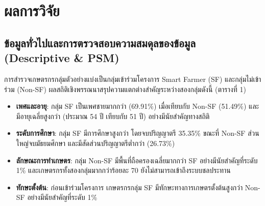 \chapter{ผลการวิจัย}

\section{ข้อมูลทั่วไปและการตรวจสอบความสมดุลของข้อมูล (Descriptive \& PSM)}

การสำรวจเกษตรกรกลุ่มตัวอย่างแบ่งเป็นกลุ่มเข้าร่วมโครงการ Smart Farmer (SF) และกลุ่มไม่เข้าร่วม (Non-SF) ผลสถิติเชิงพรรณนาสรุปความแตกต่างสำคัญระหว่างสองกลุ่มดังนี้ (ตารางที่ 1)

\begin{itemize}
\item \textbf{เพศและอายุ}: กลุ่ม SF เป็นเพศชายมากกว่า (69.91\%) เมื่อเทียบกับ Non-SF (51.49\%) และมีอายุเฉลี่ยสูงกว่า (ประมาณ 54 ปี เทียบกับ 51 ปี) อย่างมีนัยสำคัญทางสถิติ

\item \textbf{ระดับการศึกษา}: กลุ่ม SF มีการศึกษาสูงกว่า โดยจบปริญญาตรี 35.35\% ขณะที่ Non-SF ส่วนใหญ่จบมัธยมศึกษา และมีสัดส่วนปริญญาตรีต่ำกว่า (26.73\%)

\item \textbf{ลักษณะการทำเกษตร}: กลุ่ม Non-SF มีพื้นที่ถือครองเฉลี่ยมากกว่า SF อย่างมีนัยสำคัญที่ระดับ 1\% และเกษตรกรทั้งสองกลุ่มมากกว่าร้อยละ 70 ยังไม่สามารถเข้าถึงระบบชลประทาน

\item \textbf{ทักษะตั้งต้น}: ก่อนเข้าร่วมโครงการ เกษตรกรกลุ่ม SF มีทักษะทางการเกษตรตั้งต้นสูงกว่า Non-SF อย่างมีนัยสำคัญที่ระดับ 1\%
\end{itemize}


